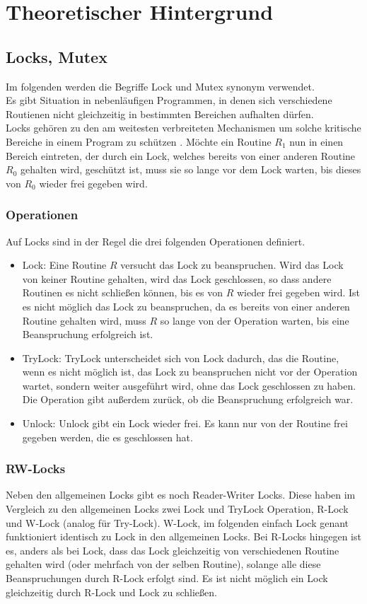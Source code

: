 \chapter{Theoretischer Hintergrund}

\section{Locks, Mutex}
Im folgenden werden die Begriffe Lock und Mutex synonym verwendet.\\
Es gibt Situation in nebenläufigen Programmen, in denen sich verschiedene 
Routienen nicht gleichzeitig in bestimmten Bereichen aufhalten dürfen.\\
Locks gehören zu den am weitesten verbreiteten Mechanismen um solche kritische 
Bereiche in einem Program zu schützen \cite{zhou}.
Möchte ein Routine $R_1$ nun in einen Bereich 
eintreten, der durch ein Lock, welches bereits von einer anderen Routine $R_0$ 
gehalten wird, geschützt ist, muss sie so lange vor dem Lock warten, bis dieses 
von $R_0$ wieder frei gegeben wird.
\subsection{Operationen}
Auf Locks sind in der Regel die drei folgenden Operationen definiert.
\begin{itemize}
    \item Lock: Eine Routine $R$ versucht das Lock zu beanspruchen. Wird das Lock 
        von keiner Routine gehalten, wird das Lock geschlossen, so dass andere 
        Routinen es nicht schließen können, bis es von $R$ wieder frei gegeben 
        wird. Ist es nicht möglich das Lock zu beanspruchen, da es bereits von 
        einer anderen Routine gehalten wird, muss $R$ so lange von der Operation 
        warten, bis eine Beanspruchung erfolgreich ist.
    \item TryLock: TryLock unterscheidet sich von Lock dadurch, das die Routine,
        wenn es nicht möglich ist, das Lock zu beanspruchen nicht vor der 
        Operation wartet, sondern weiter ausgeführt wird, ohne das Lock geschlossen
        zu haben. Die Operation gibt außerdem zurück, ob die Beanspruchung 
        erfolgreich war.
    \item Unlock: Unlock gibt ein Lock wieder frei. Es kann nur von der Routine 
        frei gegeben werden, die es geschlossen hat.
\end{itemize}
\subsection{RW-Locks}
Neben den allgemeinen Locks gibt es noch Reader-Writer Locks. Diese haben im 
Vergleich zu den allgemeinen Locks zwei Lock und TryLock Operation, R-Lock und 
W-Lock (analog für Try-Lock). W-Lock, im folgenden einfach Lock genant funktioniert 
identisch zu Lock in den allgemeinen Locks. Bei R-Locks hingegen ist es, anders 
als bei Lock, dass das Lock gleichzeitig von verschiedenen Routine gehalten wird
(oder mehrfach von der selben Routine), solange alle diese Beanspruchungen durch 
R-Lock erfolgt sind. Es ist nicht möglich ein Lock gleichzeitig durch R-Lock und 
Lock zu schließen.

